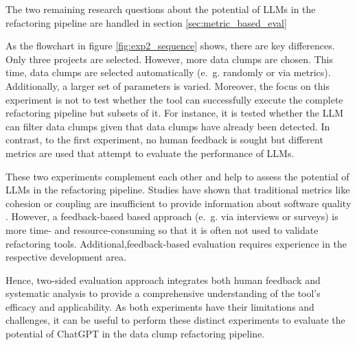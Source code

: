 The two remaining research questions about the potential of \acp{LLM} in the refactoring pipeline are handled in section \ref{sec:metric_based_eval}

 As the flowchart in figure \ref{fig:exp2_sequence} shows, there are key differences. Only three projects are selected. However, more data clumps are chosen. This time, data clumps are selected automatically (e.~g. randomly or via metrics). Additionally, a larger set of parameters is varied. Moreover, the focus on this experiment is not to test whether the tool can successfully execute the complete refactoring pipeline but subsets of it. For instance, it is tested whether the \ac{LLM} can filter data clumps given that data clumps have already been detected. In contrast, to the first experiment, no human feedback is sought but different metrics are used that attempt to evaluate the performance of \acp{LLM}. 


These two experiments complement each other and help to assess the potential of \acp{LLM} in the refactoring pipeline. 
Studies have shown that traditional metrics like cohesion or coupling are insufficient to provide information about software quality \cite{search_based_refactoring}.  However,  a feedback-based based approach (e.~g. via interviews or surveys) is more time- and resource-consuming so that it is often  not used to validate refactoring tools. Additional,feedback-based evaluation  requires experience  in the respective development area. \cite{automatic_software_refactoring_literature_review}

Hence,  two-sided evaluation approach integrates both human feedback and systematic analysis to provide a comprehensive understanding of the tool's efficacy and applicability.
As both experiments have their limitations and challenges, it can be useful to perform these distinct experiments to evaluate the potential of ChatGPT in the data clump refactoring pipeline.














